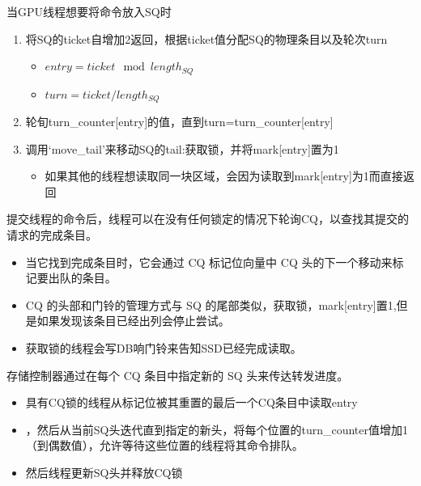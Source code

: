 \documentclass[10pt]{ctexbeamer}
\begin{document}
\begin{frame}
  当GPU线程想要将命令放入SQ时
  \begin{enumerate}
    \item 将SQ的ticket自增加2返回，根据ticket值分配SQ的物理条目以及轮次turn
    \begin{itemize}
      \item $ entry = ticket \mod length_{SQ} $
      \item $ turn = ticket/length_{SQ} $
    \end{itemize}
    \item 轮旬turn\_counter[entry]的值，直到turn=turn\_counter[entry]
    \item 调用`move\_tail'来移动SQ的tail:获取锁，并将mark[entry]置为1
    \begin{itemize}
      \item 如果其他的线程想读取同一块区域，会因为读取到mark[entry]为1而直接返回
    \end{itemize}

  \end{enumerate}
  
\end{frame}

\begin{frame}
  提交线程的命令后，线程可以在没有任何锁定的情况下轮询CQ，以查找其提交的请求的完成条目。
  \begin{itemize}
    \item 当它找到完成条目时，它会通过 CQ 标记位向量中 CQ 头的下一个移动来标记要出队的条目。
    \item CQ 的头部和门铃的管理方式与 SQ 的尾部类似，获取锁，mark[entry]置1,但是如果发现该条目已经出列会停止尝试。
    \item 获取锁的线程会写DB响门铃来告知SSD已经完成读取。
  \end{itemize}
  存储控制器通过在每个 CQ 条目中指定新的 SQ 头来传达转发进度。
  \begin{itemize}
    \item  具有CQ锁的线程从标记位被其重置的最后一个CQ条目中读取entry
    \item   ，然后从当前SQ头迭代直到指定的新头，将每个位置的turn\_counter值增加1（到偶数值），允许等待这些位置的线程将其命令排队。
    \item   然后线程更新SQ头并释放CQ锁
  \end{itemize}
\end{frame}
\end{document}
